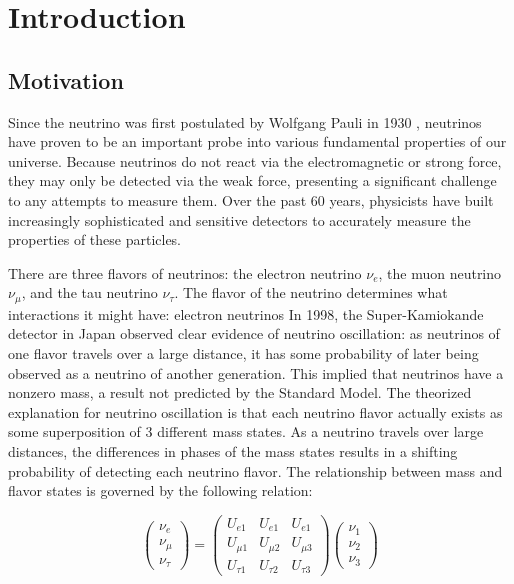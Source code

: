 
\chapter{Introduction}
\label{ch:Introduction}

\section{Motivation}

Since the neutrino was first postulated by Wolfgang Pauli in 1930 \cite{neutrinoHistory}, neutrinos have proven to be an important probe into various fundamental properties of our universe.
Because neutrinos do not react via the electromagnetic or strong force, they may only be detected via the weak force, presenting a significant challenge to any attempts to measure them.
Over the past 60 years, physicists have built increasingly sophisticated and sensitive detectors to accurately measure the properties of these particles.

There are three flavors of neutrinos: the electron neutrino $\nu_e$, the muon neutrino $\nu_\mu$, and the tau neutrino $\nu_\tau$.
The flavor of the neutrino determines what interactions it might have: electron neutrinos  
In 1998, the Super-Kamiokande detector in Japan observed clear evidence of neutrino oscillation: as neutrinos of one flavor travels over a large distance, it has some probability of later being observed as a neutrino of another generation.
This implied that neutrinos have a nonzero mass, a result not predicted by the Standard Model.
The theorized explanation for neutrino oscillation is that each neutrino flavor actually exists as some superposition of 3 different mass states. As a neutrino travels over large distances, the differences in phases of the mass states results in a shifting probability of detecting each neutrino flavor.
The relationship between mass and flavor states is governed by the following relation:

\[
\begin{pmatrix}
\nu_e \\ \nu_\mu \\ \nu_\tau
\end{pmatrix}
=
\begin{pmatrix}
U_{e1} & U_{e1} & U_{e1} \\ 
U_{\mu 1} & U_{\mu 2} & U_{\mu 3} \\
U_{\tau 1} & U_{\tau 2} & U_{\tau 3}
\end{pmatrix}
\begin{pmatrix}
\nu_1 \\ \nu_2 \\ \nu_3
\end{pmatrix}
\]



